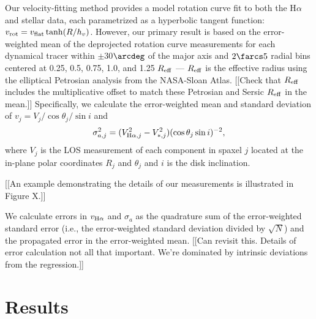 \documentclass[apj,iop,revtex4,numberedappendix]{emulateapj}
\begin{document}
Our velocity-fitting method provides a model rotation curve fit to both
the H$\alpha$ and stellar data, each parametrized as a hyperbolic
tangent function: $v_{\rm rot} = v_{\rm flat} \tanh(R/h_v)$.  However,
our primary result is based on the error-weighted mean of the
deprojected rotation curve measurements for each dynamical tracer within
$\pm$30$\arcdeg$ of the major axis and $2\farcs5$ radial bins centered
at 0.25, 0.5, 0.75, 1.0, and 1.25 $R_{\rm eff}$ --- $R_{\rm eff}$ is the
effective radius using the elliptical Petrosian analysis from the
NASA-Sloan Atlas. [[Check that $R_{\rm eff}$ includes the multiplicative
offset to match these Petrosian and Sersic $R_{\rm eff}$ in the mean.]]
Specifically, we calculate the error-weighted mean and standard
deviation of $v_j = V_j/\cos\theta_j/\sin i$ and
%
\begin{equation}
%
\sigma_{a,j}^2 = (V_{{\rm H}\alpha,j}^2 - V_{\ast,j}^2) (\cos\theta_j
\sin i)^{-2},
%
\label{eq:dproj}
%
\end{equation}
%
where $V_j$ is the LOS measurement of each component in spaxel $j$
located at the in-plane polar coordinates $R_j$ and $\theta_j$ and $i$
is the disk inclination.

[[An example demonstrating the details of our measurements is
illustrated in Figure X.]]

We calculate errors in $v_{{\rm H}\alpha}$ and $\sigma_a$ as the
quadrature sum of the error-weighted standard error (i.e., the
error-weighted standard deviation divided by $\sqrt N$) and the
propagated error in the error-weighted mean. [[Can revisit this.
Details of error calculation not all that important.  We're dominated by
intrinsic deviations from the regression.]]

\section{Results}
\label{sec:results}
\end{document}
